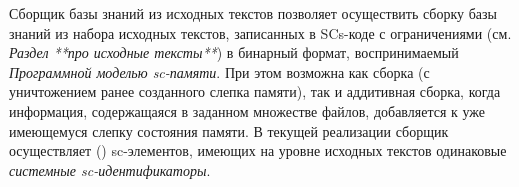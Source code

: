Сборщик базы знаний из исходных текстов позволяет осуществить сборку базы знаний из набора исходных текстов, записанных
в SCs-коде с ограничениями (см. \textit{Раздел **про исходные тексты**}) в бинарный формат, воспринимаемый
\textit{Программной моделью sc-памяти}. При этом возможна как сборка  (с уничтожением ранее созданного
слепка памяти), так и аддитивная сборка, когда информация, содержащаяся в заданном множестве файлов, добавляется к уже
имеющемуся слепку состояния памяти. В текущей реализации сборщик осуществляет  ()
sc-элементов, имеющих на уровне исходных текстов одинаковые \textit{системные sc-идентификаторы}.

\begin{SCn}
\begin{scnindent}
\end{scnindent}
\end{SCn}

